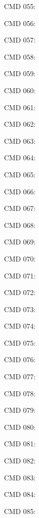 \documentclass[a4paper,fleqn]{cas-dc}
\begin{document}
CMD 055: \citep{kim2024mdagents}\par
CMD 056: \citep{langgraph2024interrupt}\par
CMD 057: \citep{han2024mast}\par
CMD 058: \citep{peffers2007dsrm}\par
CMD 059: \citep{tang2024medagents}\par
CMD 060: \citep{tang2025llmmedqa}\par
CMD 061: \citep{legalgraphrag2026}\par
CMD 062: \citep{hu2024triad}\par
CMD 063: \citep{zhao2024longagent}\par
CMD 064: \citep{qian2023chatdev}\par
CMD 065: \citep{huang2023agentcoder}\par
CMD 066: \citep{du2024multiagent_debate}\par
CMD 067: \citep{zhang2024eduplanner}\par
CMD 068: \citep{fatemi2024financialqa}\par
CMD 069: \citep{wu2024autogen}\par
CMD 070: \citep{qian2023chatdev}\par
CMD 071: \citep{anthropic2024mcp}\par
CMD 072: \citep{google2025a2a}\par
CMD 073: \citep{wu2024autogen,qian2023chatdev,anthropic2024mcp,google2025a2a}\par
CMD 074: \citep{zhou2023least_to_most}\par
CMD 075: \citep{khot2023decomposed_prompting}\par
CMD 076: \citep{wang2023plan_and_solve}\par
CMD 077: \citep{hong2024metagpt}\par
CMD 078: \citep{chen2024agentverse}\par
CMD 079: \citep{khattab2024dspy}\par
CMD 080: \citep{zhou2023least_to_most,khot2023decomposed_prompting,
wang2023plan_and_solve,hong2024metagpt,chen2024agentverse}\par
CMD 081: \citep{khattab2024dspy}\par
CMD 082: \citep{packer2023memgpt}\par
CMD 083: \citep{zhang2024memory_survey}\par
CMD 084: \citep{lewis2020rag,gao2024rag_survey}\par
CMD 085: \citep{asai2024selfrag}\par
\end{document}
